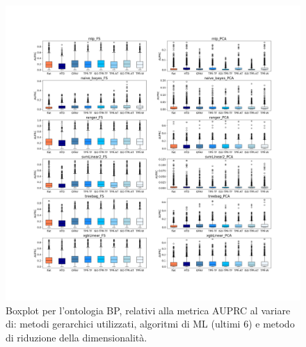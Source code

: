 \documentclass[12pt]{report}
\begin{document}
\begin{appendices}
\begin{figure}[h]
 \hspace*{-2.6cm}
\includegraphics[scale=0.34]{./images/BP_PRC_2.png}
\caption{\footnotesize{Boxplot per l'ontologia BP, relativi alla metrica AUPRC al variare di: metodi gerarchici utilizzati, algoritmi di ML (ultimi 6) e metodo di riduzione della dimensionalità.}}
\label{BP_PRC_2}
\end{figure}


\end{appendices}
\end{document}
